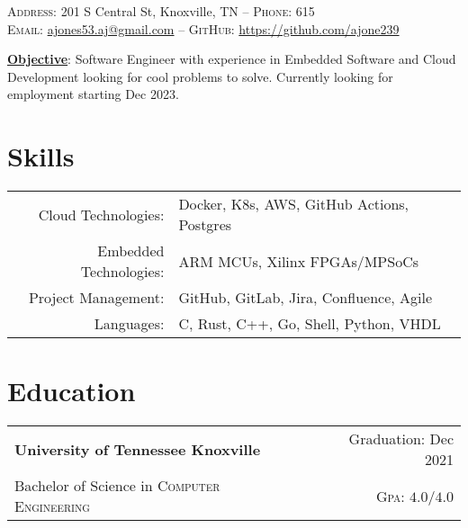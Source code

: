 \documentclass[a4paper,12pt]{article}
\begin{document}

\pagestyle{empty} %


\par{\smallskip{}
\par{\small \textsc{Address:} 201 S Central St, Knoxville, TN \---
\small \textsc{Phone:} 615\\
\textsc{Email:} \href{mailto:ajones53.aj@gmail.com}{ajones53.aj@gmail.com} \---
\textsc{GitHub:} \href{https://github.com/ajone239}{https://github.com/ajone239}
} \smallskip{}
\par{\textbf{\underline{Objective}}: Software Engineer with experience in Embedded Software and Cloud Development looking for cool problems to solve.
Currently looking for employment starting Dec 2023.
}\smallskip}{}



\section{Skills}
\begin{tabularx}{\textwidth}{rl}
   Cloud Technologies: & Docker, K8s, AWS, GitHub Actions, Postgres \\
   Embedded Technologies: & ARM MCUs, Xilinx FPGAs/MPSoCs \\
   Project Management: & GitHub, GitLab, Jira, Confluence, Agile \\
   Languages: & C, Rust, C++, Go, Shell, Python, VHDL \\
\end{tabularx}

\section{Education}
\begin{tabularx}{\textwidth}{lXr}
   \textbf{University of Tennessee Knoxville} & & Graduation: Dec 2021\\
   Bachelor of Science in \textsc{Computer Engineering} &  & \normalsize \textsc{Gpa}: $4.0/4.0$\\
\end{tabularx}
\end{document}
